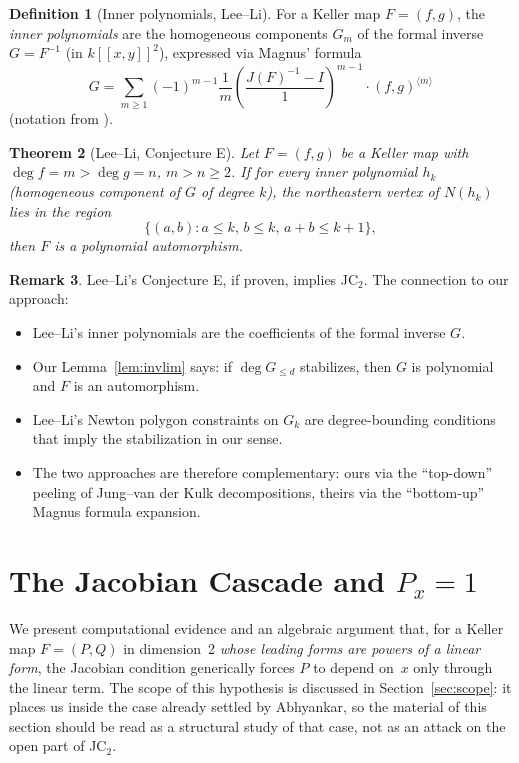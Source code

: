 \documentclass[12pt,a4paper]{article}
\newtheorem{theorem}{Theorem}[section]
\theoremstyle{definition}
\newtheorem{definition}[theorem]{Definition}
\newtheorem{remark}[theorem]{Remark}
\newcommand{\kk}{k}
\begin{document}
\begin{definition}[Inner polynomials, Lee--Li]
For a Keller map $F = (f, g)$, the \emph{inner polynomials} are the homogeneous components
$G_m$ of the formal inverse $G = F^{-1}$ (in $\kk[[x,y]]^2$), expressed via Magnus' formula
\[
  G = \sum_{m \geq 1} (-1)^{m-1} \frac{1}{m} \left(\frac{J(F)^{-1} - I}{1}\right)^{m-1}
    \cdot (f, g)^{\langle m \rangle}
\]
(notation from \cite{LeeLi}).
\end{definition}

\begin{theorem}[Lee--Li, Conjecture E]
Let $F = (f, g)$ be a Keller map with $\deg f = m > \deg g = n$, $m > n \geq 2$. If for
every inner polynomial $h_k$ (homogeneous component of $G$ of degree $k$), the northeastern
vertex of $N(h_k)$ lies in the region
\[
  \{(a, b) : a \leq k, \, b \leq k, \, a + b \leq k + 1\},
\]
then $F$ is a polynomial automorphism.
\end{theorem}

\begin{remark}
Lee--Li's Conjecture E, if proven, implies JC$_2$. The connection to our approach:
\begin{itemize}
\item Lee--Li's inner polynomials are the coefficients of the formal inverse $G$.
\item Our Lemma~\ref{lem:invlim} says: if $\deg G_{\leq d}$ stabilizes, then $G$ is
  polynomial and $F$ is an automorphism.
\item Lee--Li's Newton polygon constraints on $G_k$ are degree-bounding conditions that
  imply the stabilization in our sense.
\item The two approaches are therefore complementary: ours via the ``top-down'' peeling of
  Jung--van der Kulk decompositions, theirs via the ``bottom-up'' Magnus formula expansion.
\end{itemize}
\end{remark}

\section{The Jacobian Cascade and \texorpdfstring{$P_x = 1$}{Px = 1}}\label{sec:cascade-evidence}

We present computational evidence and an algebraic argument that, for a
Keller map $F = (P,Q)$ in dimension~2 \emph{whose leading forms are powers
of a linear form}, the Jacobian condition generically forces $P$ to
depend on~$x$ only through the linear term. The scope of this hypothesis
is discussed in Section~\ref{sec:scope}: it places us inside the case
already settled by Abhyankar, so the material of this section should be
read as a structural study of that case, not as an attack on the open
part of JC$_2$.
\end{document}
